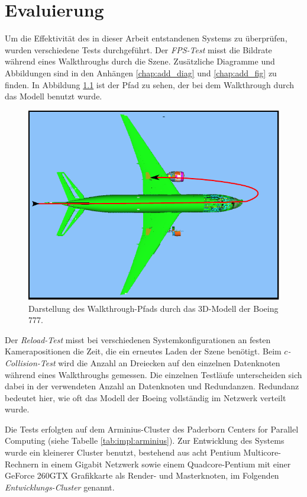 \chapter{Evaluierung}
\label{chap:eval}
%

Um die Effektivität des in dieser Arbeit entstandenen Systems zu überprüfen, wurden verschiedene Tests durchgeführt.
Der \textit{FPS-Test} misst die Bildrate während eines Walkthroughs durch die Szene. 
Zusätzliche Diagramme und Abbildungen sind in den Anhängen \ref{chap:add_diag} und \ref{chap:add_fig} zu finden. In Abbildung \ref{fig:eval:walkthrough1} ist der Pfad zu sehen, der bei dem Walkthrough durch das Modell benutzt wurde. 
\begin{figure}[h]
\centering
\includegraphics[scale=1.0]{images/walkthrough1.pdf}
  \caption{\label{fig:eval:walkthrough1} Darstellung des Walkthrough-Pfads durch das 3D-Modell der Boeing 777.}
\end{figure}
Der \emph{Reload-Test} misst bei verschiedenen Systemkonfigurationen an festen Kamerapositionen die Zeit, die ein erneutes Laden der Szene benötigt. Beim \emph{$c$-Collision-Test} wird die Anzahl an Dreiecken auf den einzelnen Datenknoten während eines Walkthroughs gemessen. Die einzelnen Testläufe unterscheiden sich dabei in der verwendeten Anzahl an Datenknoten und Redundanzen. Redundanz bedeutet hier, wie oft das Modell der Boeing vollständig im Netzwerk verteilt wurde. 

Die Tests erfolgten auf dem Arminius-Cluster des Paderborn Centers for Parallel Computing (siehe Tabelle \ref{tab:impl:arminius}). Zur Entwicklung des Systems wurde ein kleinerer Cluster benutzt, bestehend aus acht Pentium Multicore-Rechnern in einem Gigabit Netzwerk sowie einem Quadcore-Pentium mit einer GeForce 260GTX Grafikkarte als Render- und Masterknoten, im Folgenden \emph{Entwicklungs-Cluster} genannt.

